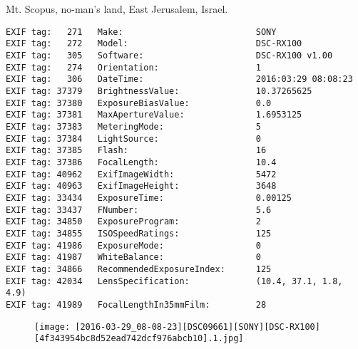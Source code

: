\section{\protect{}}
\noindent Mt. Scopus, no-man's land, East Jerusalem, Israel.
\noindent
\begin{lstlisting}
EXIF tag:   271   Make:                          SONY
EXIF tag:   272   Model:                         DSC-RX100
EXIF tag:   305   Software:                      DSC-RX100 v1.00
EXIF tag:   274   Orientation:                   1
EXIF tag:   306   DateTime:                      2016:03:29 08:08:23
EXIF tag: 37379   BrightnessValue:               10.37265625
EXIF tag: 37380   ExposureBiasValue:             0.0
EXIF tag: 37381   MaxApertureValue:              1.6953125
EXIF tag: 37383   MeteringMode:                  5
EXIF tag: 37384   LightSource:                   0
EXIF tag: 37385   Flash:                         16
EXIF tag: 37386   FocalLength:                   10.4
EXIF tag: 40962   ExifImageWidth:                5472
EXIF tag: 40963   ExifImageHeight:               3648
EXIF tag: 33434   ExposureTime:                  0.00125
EXIF tag: 33437   FNumber:                       5.6
EXIF tag: 34850   ExposureProgram:               2
EXIF tag: 34855   ISOSpeedRatings:               125
EXIF tag: 41986   ExposureMode:                  0
EXIF tag: 41987   WhiteBalance:                  0
EXIF tag: 34866   RecommendedExposureIndex:      125
EXIF tag: 42034   LensSpecification:             (10.4, 37.1, 1.8, 4.9)
EXIF tag: 41989   FocalLengthIn35mmFilm:         28

\end{lstlisting}
\clearpage
\begin{figure}
\raggedleft
\texttt{[image: [2016-03-29\_08-08-23][DSC09661][SONY][DSC-RX100][4f343954bc8d52ead742dcf976abcb10].1.jpg]}
\end{figure}


\clearpage
